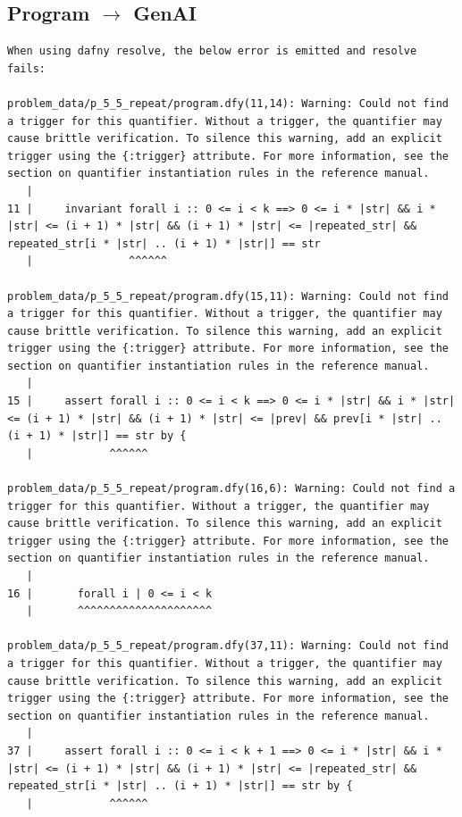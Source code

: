 \documentclass{article}
\begin{document}
\subsection*{Program $\rightarrow$ GenAI}
\begin{lstlisting}
When using dafny resolve, the below error is emitted and resolve fails:

problem_data/p_5_5_repeat/program.dfy(11,14): Warning: Could not find a trigger for this quantifier. Without a trigger, the quantifier may cause brittle verification. To silence this warning, add an explicit trigger using the {:trigger} attribute. For more information, see the section on quantifier instantiation rules in the reference manual.
   |
11 |     invariant forall i :: 0 <= i < k ==> 0 <= i * |str| && i * |str| <= (i + 1) * |str| && (i + 1) * |str| <= |repeated_str| && repeated_str[i * |str| .. (i + 1) * |str|] == str
   |               ^^^^^^

problem_data/p_5_5_repeat/program.dfy(15,11): Warning: Could not find a trigger for this quantifier. Without a trigger, the quantifier may cause brittle verification. To silence this warning, add an explicit trigger using the {:trigger} attribute. For more information, see the section on quantifier instantiation rules in the reference manual.
   |
15 |     assert forall i :: 0 <= i < k ==> 0 <= i * |str| && i * |str| <= (i + 1) * |str| && (i + 1) * |str| <= |prev| && prev[i * |str| .. (i + 1) * |str|] == str by {
   |            ^^^^^^

problem_data/p_5_5_repeat/program.dfy(16,6): Warning: Could not find a trigger for this quantifier. Without a trigger, the quantifier may cause brittle verification. To silence this warning, add an explicit trigger using the {:trigger} attribute. For more information, see the section on quantifier instantiation rules in the reference manual.
   |
16 |       forall i | 0 <= i < k
   |       ^^^^^^^^^^^^^^^^^^^^^

problem_data/p_5_5_repeat/program.dfy(37,11): Warning: Could not find a trigger for this quantifier. Without a trigger, the quantifier may cause brittle verification. To silence this warning, add an explicit trigger using the {:trigger} attribute. For more information, see the section on quantifier instantiation rules in the reference manual.
   |
37 |     assert forall i :: 0 <= i < k + 1 ==> 0 <= i * |str| && i * |str| <= (i + 1) * |str| && (i + 1) * |str| <= |repeated_str| && repeated_str[i * |str| .. (i + 1) * |str|] == str by {
   |            ^^^^^^


\end{lstlisting}
\end{document}
